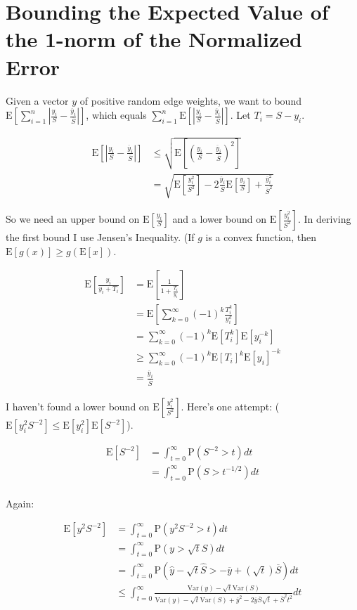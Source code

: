 \documentclass{article}
\newcommand \E[1] {\mathrm E \left[#1\right]} %
\newcommand \Var[1] {\mathrm {Var} \left(#1\right)} %
\newcommand \p[1] {\mathrm P \left(#1\right)}
\begin{document}
\section{Bounding the Expected Value of the 1-norm of the Normalized Error}

Given a vector $y$ of positive random edge weights, we want to bound $\E{\sum_{i=1}^n \left|\frac {y_i} S - \frac{\overline y_i}{\overline S}\right|}$, which equals $\sum_{i=1}^n \E{\left|\frac {y_i} S - \frac{\overline y_i}{\overline S}\right|}$. Let $T_i=S-y_i$.

\begin{align*}
\E{\left|\frac{y_i}S - \frac{\overline y_i}{\overline S}\right|} &\leq \sqrt{\E{\left(\frac{y_i}S - \frac{\overline y_i}{\overline S}\right)^2}} \\
&= \sqrt{\E{\frac{y_i^2}{S^2}} - 2\frac{\overline y_i}{\overline S}\E{\frac{y_i}S}+\frac{\overline y_i^2}{\overline S^2}}
\end{align*}

So we need an upper bound on $\E{\frac{y_i}S}$ and a lower bound on $\E{\frac{y_i^2}{S^2}}$. In deriving the first bound I use Jensen's Inequality. (If $g$ is a convex function, then $\E{g(x)}\geq g(\E{x})$.

\begin{align*}
\E{\frac{y_i}{y_i+T_i}} &= \E{\frac 1{1+\frac{T_i}{y_i}}} \\
&= \E{\sum_{k=0}^\infty (-1)^k \frac{T_i^k}{y_i^k}} \\
&= \sum_{k=0}^\infty (-1)^k \E{T_i^k}\E{y_i^{-k}} \\
&\geq \sum_{k=0}^\infty (-1)^k \E{T_i}^k \E{y_i}^{-k} \\
&= \frac{\overline y_i}{\overline S}
\end{align*}

I haven't found a lower bound on $\E{\frac{y_i^2}{S^2}}$. Here's one attempt: ($\E{y_i^2 S^{-2}} \leq \E{y_i^2} \E{S^{-2}}$).

\begin{align*}
\E{S^{-2}} &= \int_{t=0}^\infty \p{S^{-2}>t}dt \\
&= \int_{t=0}^\infty \p{S>t^{-1/2}} dt \\
\end{align*}

Again:

\begin{align*}
\E{y^2 S^{-2}} &= \int_{t=0}^\infty \p{y^2 S^{-2} > t} dt \\
&= \int_{t=0}^\infty \p{y>\sqrt t S} dt \\
&= \int_{t=0}^\infty \p{\hat y - \sqrt t \hat S > -\overline y + (\sqrt t) \overline S} dt \\
&\leq \int_{t=0}^\infty \frac{\Var y - \sqrt t \Var S}{\Var y - \sqrt t \Var S + \overline y^2 - 2\overline y\overline S\sqrt t + \overline S^2 t^2} dt
\end{align*}
\end{document}
